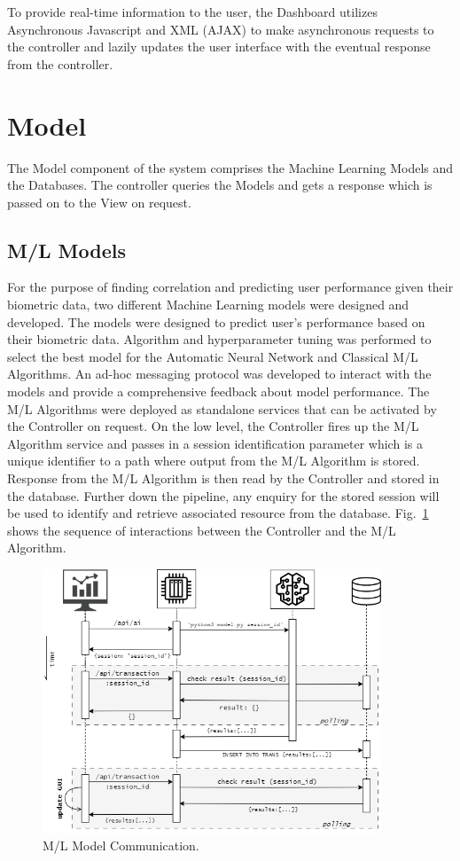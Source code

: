 To provide real-time information to the user, the Dashboard utilizes Asynchronous Javascript and XML (AJAX) to make asynchronous requests to
the controller and lazily updates the user interface with the eventual response from the controller. 

\section{Model}
The Model component of the system comprises the Machine Learning Models and the Databases. The controller queries the Models and gets a 
response which is passed on to the View on request.

\subsection{M/L Models}
For the purpose of finding correlation and predicting user performance given their biometric data, two different Machine Learning models 
were designed and developed. The models were designed to predict user's performance based on their biometric data. 
Algorithm and hyperparameter tuning was performed to select the best model for the Automatic Neural Network and Classical M/L Algorithms.
An ad-hoc messaging protocol was developed to interact with the models and provide a comprehensive feedback about model performance. 
The M/L Algorithms were deployed as standalone services that can be activated by the Controller on request. On the low level, the Controller
fires up the M/L Algorithm service and passes in a session identification parameter which is a unique identifier to a path where output from the
M/L Algorithm is stored. Response from the M/L Algorithm is then read by the Controller and stored in the database. Further down the pipeline,
any enquiry for the stored session will be used to identify and retrieve associated resource from the database. Fig.~\ref{image:model_comm}
shows the sequence of interactions between the Controller and the M/L Algorithm.

\begin{figure}[h!]
    \includegraphics[width=0.9\textwidth]{images/model_comm.png}
    \caption{M/L Model Communication.}
    \label{image:model_comm}
\end{figure}

